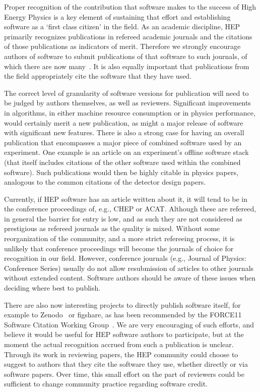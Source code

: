 \documentclass[12pt,a4paper]{article}
\begin{document}
Proper recognition of the contribution that software makes to the
success of High Energy Physics is a key element of sustaining that
effort and establishing software as a `first class citizen' in the
field. As an academic discipline, HEP primarily recognizes publications
in refereed academic journals and the citations of those publications as
indicators of merit. Therefore we strongly encourage authors of software
to submit publications of that software to such journals, of which there
are now many~\cite{SSI2017}.
It is also equally important that publications from the field
appropriately cite the software that they have used.

The correct level of granularity of software versions for publication
will need to be judged by authors themselves, as well as reviewers.
Significant improvements in algorithms, in either machine resource
consumption or in physics performance, would certainly merit a new
publication, as might a major release of software with significant new
features. There is also a strong case for having an overall publication
that encompasses a major piece of combined software used by an
experiment. One example is an article on an experiment's offline
software stack (that itself includes citations of the other software
used within the combined software). Such publications would then be
highly citable in physics papers, analogous to the common citations of
the detector design papers.

Currently, if HEP software has an article written about it, it will tend
to be in the conference proceedings of, e.g., CHEP or ACAT. Although
these are refereed, in general the barrier for entry is low, and as such
they are not considered as prestigious as refereed journals as the
quality is mixed. Without some reorganization of the community, and a
more strict refereeing process, it is unlikely that conference
proceedings will become the journals of choice for recognition in our
field. However, conference journals (e.g., Journal of Physics:
Conference Series) usually do not allow resubmission of articles to
other journals without extended content. Software authors should be
aware of these issues when deciding where best to publish.

There are also now interesting projects to directly publish software
itself, for example to Zenodo~\cite{Zenodo} or
figshare\cite{figshare}, as has been recommended by the
FORCE11
Software Citation Working Group~\cite{FORCE11}. We are very
encouraging of such efforts, and believe it would be useful for HEP
software authors to participate, but at the moment the actual
recognition accrued from such a publication is unclear. Through its work
in reviewing papers, the HEP community could choose to suggest to
authors that they cite the software they use, whether directly or via
software papers. Over time, this small effort on the part of reviewers
could be sufficient to change community practice regarding software
credit.
\end{document}
